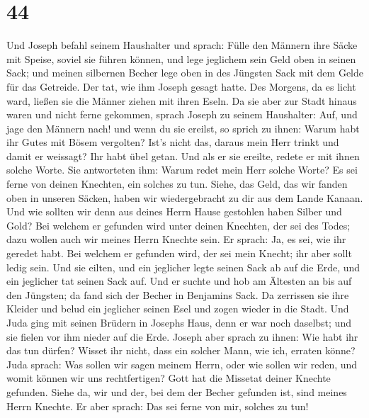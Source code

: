 \hypertarget{section-43}{%
\section{44}\label{section-43}}

 Und Joseph befahl seinem Haushalter und sprach: Fülle den
Männern ihre Säcke mit Speise, soviel sie führen können, und lege
jeglichem sein Geld oben in seinen Sack;  und meinen
silbernen Becher lege oben in des Jüngsten Sack mit dem Gelde für das
Getreide. Der tat, wie ihm Joseph gesagt hatte.  Des
Morgens, da es licht ward, ließen sie die Männer ziehen mit ihren Eseln.
 Da sie aber zur Stadt hinaus waren und nicht ferne
gekommen, sprach Joseph zu seinem Haushalter: Auf, und jage den Männern
nach! und wenn du sie ereilst, so sprich zu ihnen: Warum habt ihr Gutes
mit Bösem vergolten?  Ist's nicht das, daraus mein Herr
trinkt und damit er weissagt? Ihr habt übel getan.  Und
als er sie ereilte, redete er mit ihnen solche Worte.  Sie
antworteten ihm: Warum redet mein Herr solche Worte? Es sei ferne von
deinen Knechten, ein solches zu tun.  Siehe, das Geld, das
wir fanden oben in unseren Säcken, haben wir wiedergebracht zu dir aus
dem Lande Kanaan. Und wie sollten wir denn aus deines Herrn Hause
gestohlen haben Silber und Gold?  Bei welchem er gefunden
wird unter deinen Knechten, der sei des Todes; dazu wollen auch wir
meines Herrn Knechte sein.  Er sprach: Ja, es sei, wie
ihr geredet habt. Bei welchem er gefunden wird, der sei mein Knecht; ihr
aber sollt ledig sein.  Und sie eilten, und ein jeglicher
legte seinen Sack ab auf die Erde, und ein jeglicher tat seinen Sack
auf.  Und er suchte und hob am Ältesten an bis auf den
Jüngsten; da fand sich der Becher in Benjamins Sack.  Da
zerrissen sie ihre Kleider und belud ein jeglicher seinen Esel und zogen
wieder in die Stadt.  Und Juda ging mit seinen Brüdern in
Josephs Haus, denn er war noch daselbst; und sie fielen vor ihm nieder
auf die Erde.  Joseph aber sprach zu ihnen: Wie habt ihr
das tun dürfen? Wisset ihr nicht, dass ein solcher Mann, wie ich,
erraten könne?  Juda sprach: Was sollen wir sagen meinem
Herrn, oder wie sollen wir reden, und womit können wir uns
rechtfertigen? Gott hat die Missetat deiner Knechte gefunden. Siehe da,
wir und der, bei dem der Becher gefunden ist, sind meines Herrn Knechte.
 Er aber sprach: Das sei ferne von mir, solches zu tun!
